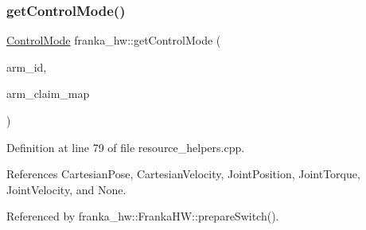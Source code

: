 \subsubsection{\texorpdfstring{get\+Control\+Mode()}{getControlMode()}}
{\footnotesize\ttfamily \hyperlink{namespacefranka__hw_afa416558ce4baace5ac6c71bd5d2c98c}{Control\+Mode} franka\+\_\+hw\+::get\+Control\+Mode (\begin{DoxyParamCaption}\item[{const std\+::string \&}]{arm\+\_\+id,  }\item[{\hyperlink{namespacefranka__hw_a9b9c672b3e064953e816024fc2f9cf0f}{Arm\+Claimed\+Map} \&}]{arm\+\_\+claim\+\_\+map }\end{DoxyParamCaption})}



Definition at line 79 of file resource\+\_\+helpers.\+cpp.



References Cartesian\+Pose, Cartesian\+Velocity, Joint\+Position, Joint\+Torque, Joint\+Velocity, and None.



Referenced by franka\+\_\+hw\+::\+Franka\+H\+W\+::prepare\+Switch().


